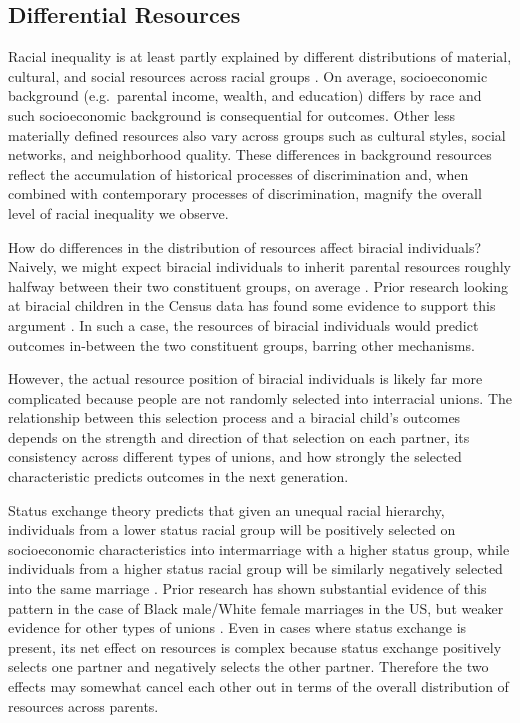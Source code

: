 \documentclass[
  12pt,
  letterpaper,
]{article}
\begin{document}
\hypertarget{differential-resources}{%
\subsection{Differential Resources}\label{differential-resources}}

Racial inequality is at least partly explained by different
distributions of material, cultural, and social resources across racial
groups \autocite{conley_being_1999}. On average, socioeconomic
background (e.g.~parental income, wealth, and education) differs by race
and such socioeconomic background is consequential for outcomes. Other
less materially defined resources also vary across groups such as
cultural styles, social networks, and neighborhood quality. These
differences in background resources reflect the accumulation of
historical processes of discrimination and, when combined with
contemporary processes of discrimination, magnify the overall level of
racial inequality we observe.

How do differences in the distribution of resources affect biracial
individuals? Naively, we might expect biracial individuals to inherit
parental resources roughly halfway between their two constituent groups,
on average \autocite{chew_american_1989}. Prior research looking at
biracial children in the Census data has found some evidence to support
this argument \autocite{chew_american_1989}. In such a case, the
resources of biracial individuals would predict outcomes in-between the
two constituent groups, barring other mechanisms.

However, the actual resource position of biracial individuals is likely
far more complicated because people are not randomly selected into
interracial unions. The relationship between this selection process and
a biracial child's outcomes depends on the strength and direction of
that selection on each partner, its consistency across different types
of unions, and how strongly the selected characteristic predicts
outcomes in the next generation.

Status exchange theory predicts that given an unequal racial hierarchy,
individuals from a lower status racial group will be positively selected
on socioeconomic characteristics into intermarriage with a higher status
group, while individuals from a higher status racial group will be
similarly negatively selected into the same marriage
\autocite{davis_intermarriage_1941,merton_intermarriage_1941,fu_racial_2001}.
Prior research has shown substantial evidence of this pattern in the
case of Black male/White female marriages in the US, but weaker evidence
for other types of unions
\autocite{gullickson_education_2006,fu_racial_2001,kalmijn_educational_2010,hou_interracial_2011}.
Even in cases where status exchange is present, its net effect on
resources is complex because status exchange positively selects one
partner and negatively selects the other partner. Therefore the two
effects may somewhat cancel each other out in terms of the overall
distribution of resources across parents.
\end{document}
